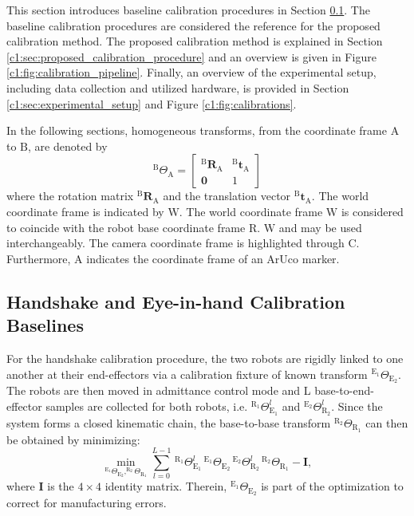This section introduces baseline calibration procedures in Section \ref{c1:sec:handshake_and_eye_in_hand_calibration}. The baseline calibration procedures are considered the reference for the proposed calibration method. The proposed calibration method is explained in Section \ref{c1:sec:proposed_calibration_procedure} and an overview is given in Figure \ref{c1:fig:calibration_pipeline}. Finally, an overview of the experimental setup, including data collection and utilized hardware, is provided in Section \ref{c1:sec:experimental_setup} and Figure \ref{c1:fig:calibrations}.

In the following sections, homogeneous transforms, from the coordinate frame $\text{A}$ to $\text{B}$, are denoted by $$^\text{B}\Theta_\text{A}=\begin{bmatrix} ^\text{B}\mathbf{R}_\text{A} & ^\text{B}\textbf{t}_\text{A} \\ \mathbf{0} & 1 \end{bmatrix}$$ where the rotation matrix $^\text{B}\mathbf{R}_\text{A}$ and the translation vector $^\text{B}\textbf{t}_\text{A}$. The world coordinate frame is indicated by $\text{W}$. The world coordinate frame $\text{W}$ is considered to coincide with the robot base coordinate frame $\text{R}$. $\text{W}$ and  may be used interchangeably. The camera coordinate frame is highlighted through $\text{C}$. Furthermore, $\text{A}$ indicates the coordinate frame of an ArUco marker.

\subsection{Handshake and Eye-in-hand Calibration Baselines}
\label{c1:sec:handshake_and_eye_in_hand_calibration}
For the handshake calibration procedure, the two robots are rigidly linked to one another at their end-effectors via a calibration fixture of known transform $^{\text{E}_1}\Theta_{\text{E}_2}$. The robots are then moved in admittance control mode and L base-to-end-effector samples are collected for both robots, i.e. $^{\text{R}_1}\Theta^l_{\text{E}_1}$ and $^{\text{E}_2}\Theta^l_{\text{R}_2}$. Since the system forms a closed kinematic chain, the base-to-base transform $^{\text{R}_2}\Theta_{\text{R}_1}$ can then be obtained by minimizing:
%
\begin{equation}
    \label{c1:eq:handsake}
    \min_{^{\text{E}_1}\Theta_{\text{E}_2}, ^{\text{R}_2}\Theta_{\text{R}_1}} \sum_{l=0}^{L-1}\,^{\text{R}_1}\Theta^l_{\text{E}_1}\,^{\text{E}_1}\Theta_{\text{E}_2}\,^{\text{E}_2}\Theta^l_{\text{R}_2}\,^{\text{R}_2}\Theta_{\text{R}_1} - \mathbf{I},
\end{equation}
%
where $\mathbf{I}$ is the $4\times4$ identity matrix. Therein, $^{\text{E}_1}\Theta_{\text{E}_2}$ is part of the optimization to correct for manufacturing errors.

